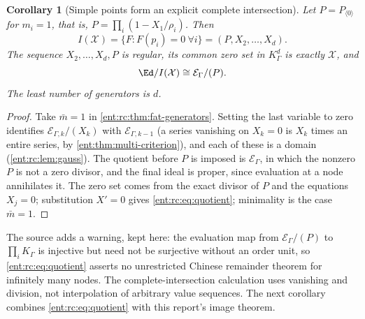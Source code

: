 \documentclass[11pt]{article}
\theoremstyle{plain}
\theoremstyle{plain}
\theoremstyle{plain}
\newtheorem{corollary}[corollary]{Corollary}
\theoremstyle{definition}
\theoremstyle{definition}
\theoremstyle{definition}
\theoremstyle{definition}
\theoremstyle{remark}
\newcommand{\K}{K_\Gamma}\newcommand{\KD}{K_\Delta}
\newcommand{\E}{\mathcal E_\Gamma}
\begin{document}
\begin{corollary}[Simple points form an explicit complete intersection]
\label{ent:rc:cor:ci}
Let $P=P_{\langle0\rangle}$ for $m_i=1$, that is, $P=\prod_i(1-X_1/\rho_i)$.
Then
\begin{equation}\label{ent:rc:eq:simple-ideal}
 I(\mathcal X)=\{F:F(p_i)=0\ \forall i\}=(P,X_2,\ldots,X_d).
\end{equation}
The sequence $X_2,\ldots,X_d,P$ is regular, its common zero set in $\K^d$ is
exactly $\mathcal X$, and
\begin{equation}\label{ent:rc:eq:quotient}
 \Ed/I(\mathcal X)\cong\E/(P).
\end{equation}
The least number of generators is $d$.
\end{corollary}
\begin{proof}
Take $\bar m=1$ in \cref{ent:rc:thm:fat-generators}. Setting the last
variable to zero identifies $\mathcal E_{\Gamma,k}/(X_k)$ with
$\mathcal E_{\Gamma,k-1}$ (a series vanishing on $X_k=0$ is $X_k$ times an
entire series, by \cref{ent:thm:multi-criterion}), and each of these is a
domain (\cref{ent:rc:lem:gauss}). The quotient before $P$ is imposed is $\E$,
in which the nonzero $P$ is not a zero divisor, and the final ideal is proper,
since evaluation at a node annihilates it. The zero set comes from the exact
divisor of $P$ and the equations $X_j=0$; substitution $X'=0$ gives
\eqref{ent:rc:eq:quotient}; minimality is the case $\bar m=1$.
\end{proof}

The source adds a warning, kept here: the evaluation map from $\E/(P)$ to
$\prod_i\K$ is injective but need not be surjective without an order unit, so
\eqref{ent:rc:eq:quotient} asserts no unrestricted Chinese remainder theorem for
infinitely many nodes. The complete-intersection calculation uses vanishing
and division, not interpolation of arbitrary value sequences. The next
corollary combines \eqref{ent:rc:eq:quotient} with this report's image
theorem.
\end{document}
